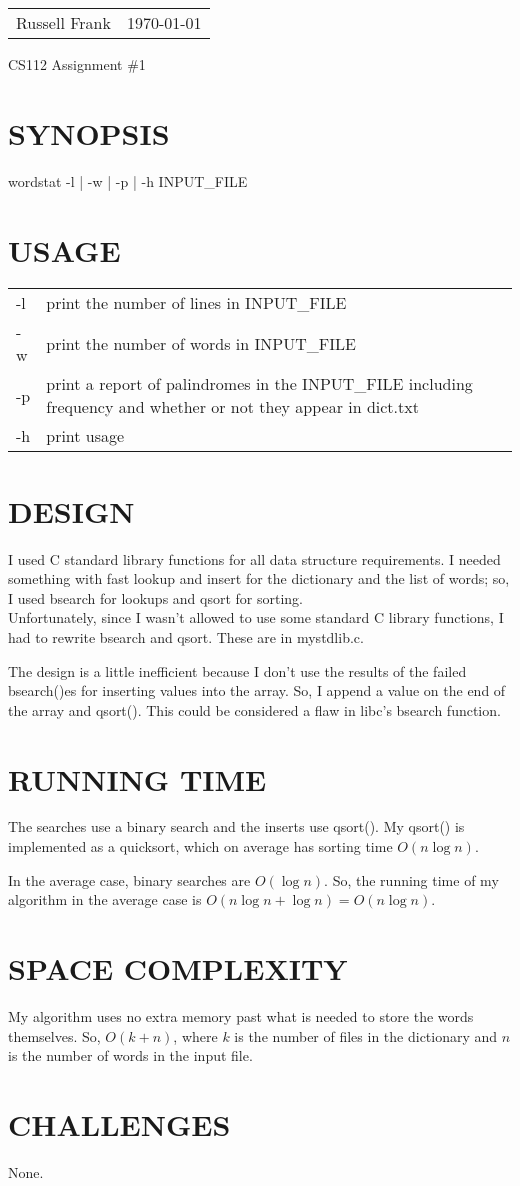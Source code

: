 \documentclass[10pt]{article}
\makeatletter
\newcommand{\head}[1]{
   \begin{tabular*}{7.1in}{@{}l@{\extracolsep{\fill}}r}
      Russell Frank & \today \\
   \end{tabular*}
   \begin{center} \LARGE #1 \normalsize \end{center}
   \vskip 0.1in
}
\makeatother
\begin{document}
\head{CS112 Assignment \#1}

\section{SYNOPSIS}
wordstat -l | -w | -p | -h INPUT\_FILE

\section{USAGE}

\begin{tabular}{ll}
   -l & print the number of lines in INPUT\_FILE \\
   -w & print the number of words in INPUT\_FILE \\
   -p & print a report of palindromes in the INPUT\_FILE including frequency
        and whether or not they appear in dict.txt\\
   -h & print usage \\
\end{tabular}

\section{DESIGN}

I used C standard library functions for all data structure requirements.
I needed something with fast lookup and insert for the dictionary and the
list of words; so, I used bsearch for lookups and qsort for sorting. \\

Unfortunately, since I wasn't allowed to use some standard C library functions,
I had to rewrite bsearch and qsort.  These are in mystdlib.c.

The design is a little inefficient because I don't use the results of the
failed bsearch()es for inserting values into the array.  So, I append a
value on the end of the array and qsort().  This could be considered a flaw
in libc's bsearch function.

\section{RUNNING TIME}

The searches use a binary search and the inserts use qsort().  My qsort() is
implemented as a quicksort, which on average has sorting time $O(n \log n)$.

In the average case, binary searches are $O(\log n)$.  So, the running time of
my algorithm in the average case is $O(n \log n + \log n) = O(n \log n)$.

\section{SPACE COMPLEXITY}
My algorithm uses no extra memory past what is needed to store the words
themselves.  So, $O(k + n)$, where $k$ is the number of files in the
dictionary and $n$ is the number of words in the input file.

\section{CHALLENGES}
None.
\end{document}
